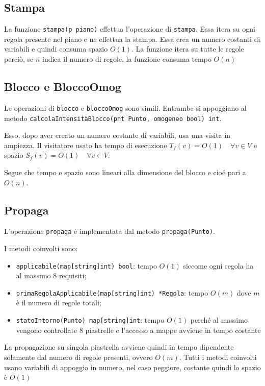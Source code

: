 \documentclass[a4paper,12pt]{article}
\begin{document}
	\subsection{Stampa}
	La funzione \texttt{stampa(p piano)} effettua l'operazione di \texttt{stampa}.
	Essa itera su ogni regola presente nel piano e ne effettua la stampa.
	Essa crea un numero costanti di variabili e quindi consuma spazio \(O(1)\).
	La funzione itera su tutte le regole perciò, se \(n\) indica il numero di regole, la funzione consuma tempo \(O(n)\)
	
	\subsection{Blocco e BloccoOmog}
	Le operazioni di \texttt{blocco} e \texttt{bloccoOmog} sono simili.
	Entrambe si appoggiano al metodo \texttt{calcolaIntensitàBlocco(pnt Punto, omogeneo bool) int}.
	
	Esso, dopo aver creato un numero costante di variabili, usa una visita in ampiezza.
	Il visitatore usato ha tempo di esecuzione \(T_f(v) = O(1) \quad \forall v \in V\) e spazio \(S_f(v) = O(1) \quad \forall v \in V\).
	
	Segue che tempo e spazio sono lineari alla dimensione del blocco e cioé pari a \(O(n)\).
	
	\subsection{Propaga}\label{subsec:propaga}
	L'operazione \texttt{propaga} è implementata dal metodo \texttt{propaga(Punto)}.
	
	I metodi coinvolti sono:
	\begin{itemize}
		\item \texttt{applicabile(map[string]int) bool}: 
		tempo \(O(1)\) siccome ogni regola ha al massimo 8 requisiti;
		\item \texttt{primaRegolaApplicabile(map[string]int) *Regola}:
		tempo \(O(m)\) dove \(m\) è il numero di regole totali;
		\item \texttt{statoIntorno(Punto) map[string]int}:
		tempo \(O(1)\) perché al massimo vengono controllate 8 piastrelle e l'accesso a mappe avviene in tempo costante
	\end{itemize}
	
	La propagazione su singola piastrella avviene quindi in tempo dipendente solamente dal numero di regole presenti, ovvero \(O(m)\).
	Tutti i metodi coinvolti usano variabili di appoggio in numero, nel caso peggiore, costante quindi lo spazio è \(O(1)\)
	
\end{document}
